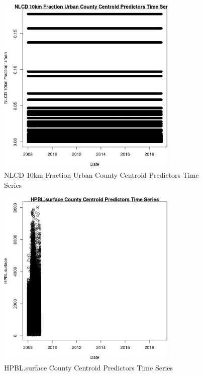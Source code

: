 \begin{figure} 
\centering  
\includegraphics[width=0.77\textwidth]{Code_Outputs/df_report_ML_predictors_CountyCentroid_Locations_Dates_2008-01-01to2018-12-31_NLCD_10km_Fraction_UrbanvDate.jpg} 
\caption{\label{fig:df_report_ML_predictors_CountyCentroid_Locations_Dates_2008-01-01to2018-12-31NLCD_10km_Fraction_UrbanvDate}NLCD 10km Fraction Urban County Centroid Predictors Time Series} 
\end{figure} 
 

\begin{figure} 
\centering  
\includegraphics[width=0.77\textwidth]{Code_Outputs/df_report_ML_predictors_CountyCentroid_Locations_Dates_2008-01-01to2018-12-31_HPBLsurfacevDate.jpg} 
\caption{\label{fig:df_report_ML_predictors_CountyCentroid_Locations_Dates_2008-01-01to2018-12-31HPBLsurfacevDate}HPBL.surface County Centroid Predictors Time Series} 
\end{figure} 
 

